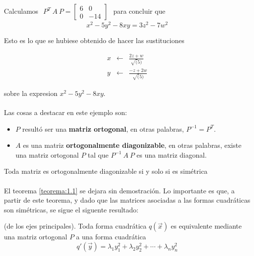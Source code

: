 \begin{example}
Calculamos $ \begin{matrix} 
    P^{T}~A~P = \begin{bmatrix}
6 & 0\\
0 & -14
\end{bmatrix}
    \end{matrix}$ para concluir que 
\begin{equation*}
x^{2} - 5y^{2} - 8xy = 3z^{2} - 7w^{2}
\end{equation*}

Esto es lo que se hubiese obtenido de hacer las sustituciones 

\begin{eqnarray*}
x & \leftarrow & \frac{2z + w}{\sqrt(5)}\\
y & \leftarrow & \frac{-z + 2w}{\sqrt(5)}
\end{eqnarray*}

sobre la expresion $x^{2} - 5y^{2} - 8xy$.
\end{example}

\paragraph*{}
Las cosas a destacar en este ejemplo son:
\begin{itemize}
    \item $P$ resultó ser una \textbf{matriz ortogonal}, en otras palabras, $P^{-1} = P^{T}$.
    \item $A$ es una matriz \textbf{ortogonalmente diagonizable}, en otras palabras, existe una matriz ortogonal $P$ tal que $P^{-1}~A~P$ es una matriz diagonal.
\end{itemize}

\begin{theorem}
Toda matriz es ortogonalmente diagonizable si y solo si es simétrica
\label{teorema:1.1}
\end{theorem}

\paragraph*{}
El teorema \ref{teorema:1.1} se dejara sin demostración. Lo importante es que, a partir de este teorema, y dado que las matrices asociadas a las formas cuadráticas son simétricas, se sigue el siguente resultado:

\begin{theorem}(de los ejes principales).
Toda forma cuadrática $q(\overrightarrow{x})$ es equivalente mediante una matriz ortogonal $P$ a una forma cuadrática 
\begin{equation}
    q'(\overrightarrow{y}) = \lambda_{1}y_{1}^{2} + \lambda_{2}y_{2}^{2} + \cdots + \lambda_{n}y_{n}^{2}
\end{equation}
\label{teorema:1.2}
\end{theorem}

